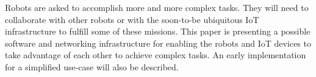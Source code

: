 Robots are asked to accomplish more and more complex tasks.
They will need to collaborate with other robots or with the soon-to-be ubiquitous IoT infrastructure to fulfill some of these missions.
This paper is presenting a possible software and networking infrastructure for enabling the robots and IoT devices to take advantage of each other to achieve complex tasks.
An early implementation for a simplified use-case will also be described.
